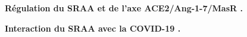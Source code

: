\documentclass[
  a4paper,
  DIV=11,
  numbers=noendperiod,
  listof=totoc]{scrreprt}
\begin{document}
\begin{figure}


\caption[Régulation du SRAA et de l'axe
ACE2/Ang-1-7/AT1/MasR]{\label{fig-ace2-masR}\textbf{Régulation du SRAA
et de l'axe ACE2/Ang-1-7/MasR \autocite{Brojakowska.2020}.}}

\end{figure}%

\begin{figure}


\caption[Interaction du SRAA avec la
COVID-19.]{\label{fig-sraa-covid19}\textbf{Interaction du SRAA avec la
COVID-19 \autocite{Brojakowska.2020}.}}

\end{figure}%
\end{document}
